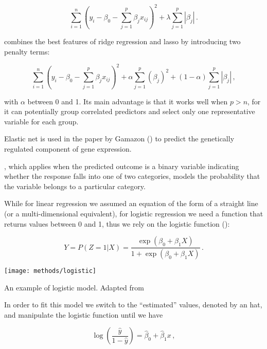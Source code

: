 \documentclass[../main.tex]{subfiles}
\begin{document}
\begin{equation}
	\sum_{i=1}^{n}\left(y_i-\beta_0-\sum_{j=1}^{p}\beta_jx_{ij}\right)^2+
		\lambda\sum_{j=1}^{p}\left|\beta_j\right|\,.
\end{equation}

 combines the best features of 
ridge regression and lasso by introducing two penalty terms:

\begin{equation}
	\sum_{i=1}^{n}\left(y_i-\beta_0-\sum_{j=1}^{p}\beta_jx_{ij}\right)^2+
		\alpha\sum_{j=1}^{p}\left(\beta_j\right)^2+
		(1-\alpha)\sum_{j=1}^{p}\left|\beta_j\right|\,,
\end{equation}

with $\alpha$ between 0 and 1. Its main advantage is that it works well 
when $p>n$, for it can potentially group correlated predictors and 
select only one representative variable for each group.

Elastic net is used in the paper by Gamazon \etal () 
to predict the genetically regulated component of gene expression.

, which applies when the 
predicted outcome is a binary variable indicating whether the response 
falls into one of two categories, models the probability that the 
variable belongs to a particular category.

While for linear regression we assumed an equation of the form of a 
straight line (or a multi-dimensional equivalent), for logistic 
regression we need a function that returns values between 0 and 1, thus 
we rely on the logistic function ():

\begin{equation}
	Y = P(Z = 1 | X) =
		\frac{\exp(\beta_0+\beta_1X)}{1+\exp(\beta_0+\beta_1X)}\,.
\end{equation}

\begin{marginfigure}
	\texttt{[image: methods/logistic]}
	\caption{An example of logistic model. Adapted from \textcite{James2013}}
\end{marginfigure}

In order to fit this model we switch to the \enquote{estimated} values, 
denoted by an hat, and manipulate the logistic function until we have

\begin{equation}
	\log\left(\frac{\hat{y}}{1-\hat{y}}\right) =
		\hat{\beta}_0 + \hat{\beta}_1 x\,,
\end{equation}
\end{document}
